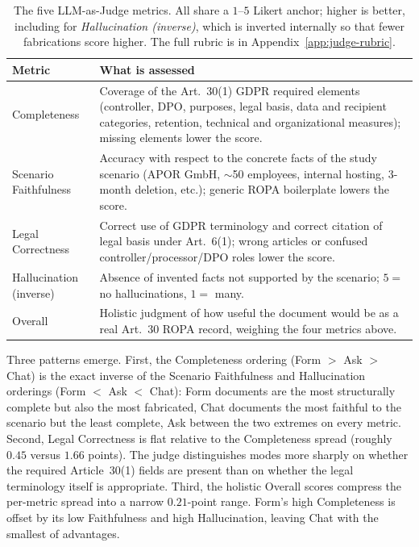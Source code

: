 \begin{table}[htbp]
    \centering
    \small
    \begin{tabularx}{\textwidth}{@{}lX@{}}
\toprule
Metric & What is assessed \\
\midrule
Completeness            & Coverage of the Art.~30(1) GDPR required elements (controller, DPO, purposes, legal basis, data and recipient categories, retention, technical and organizational measures); missing elements lower the score. \\
\addlinespace
Scenario Faithfulness   & Accuracy with respect to the concrete facts of the study scenario (APOR GmbH, $\sim$50 employees, internal hosting, 3-month deletion, etc.); generic ROPA boilerplate lowers the score. \\
\addlinespace
Legal Correctness       & Correct use of GDPR terminology and correct citation of legal basis under Art.~6(1); wrong articles or confused controller/processor/DPO roles lower the score. \\
\addlinespace
Hallucination (inverse) & Absence of invented facts not supported by the scenario; $5 =$ no hallucinations, $1 =$ many. \\
\addlinespace
Overall                 & Holistic judgment of how useful the document would be as a real Art.~30 ROPA record, weighing the four metrics above. \\
\bottomrule
    \end{tabularx}
    \caption{The five LLM-as-Judge metrics. All share a $1$--$5$
        Likert anchor; higher is better, including for
        \emph{Hallucination (inverse)}, which is inverted internally so
        that fewer fabrications score higher. The full rubric is in
        Appendix~\ref{app:judge-rubric}.}
    \label{tab:judge-metrics}
\end{table}

Three patterns emerge. First, the Completeness ordering (Form
$>$ Ask $>$ Chat) is the exact inverse of the Scenario
Faithfulness and Hallucination orderings (Form $<$ Ask $<$ Chat):
Form documents are the most structurally complete but also the
most fabricated, Chat documents the most faithful to the scenario
but the least complete, Ask between the two extremes on every
metric. Second, Legal Correctness is flat relative to the
Completeness spread (roughly $0.45$ versus $1.66$ points). The
judge distinguishes modes more sharply on whether the required
Article~30(1) fields are present than on whether the legal
terminology itself is appropriate. Third, the holistic Overall
scores compress the per-metric spread into a narrow $0.21$-point
range. Form's high Completeness is offset by its low Faithfulness
and high Hallucination, leaving Chat with the smallest of
advantages.

